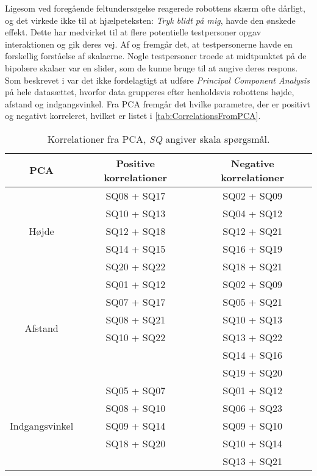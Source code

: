 Ligesom ved foregående feltundersøgelse reagerede robottens skærm ofte dårligt, og det virkede ikke til at hjælpeteksten: \textit{Tryk blidt på mig}, havde den ønskede effekt. Dette har medvirket til at flere potentielle testpersoner opgav interaktionen og gik deres vej.\blankline
%
Af  og  fremgår det, at testpersonerne havde en forskellig forståelse af skalaerne. Nogle testpersoner troede at midtpunktet på de bipolære skalaer var en slider, som de kunne bruge til at angive deres respons. \blankline 
%
Som beskrevet i  var det ikke fordelagtigt at udføre \textit{Principal Component Analysis} på hele datasættet, hvorfor data grupperes efter henholdsvis robottens højde, afstand og indgangsvinkel. Fra PCA fremgår det hvilke parametre, der er positivt og negativt korreleret, hvilket er listet i \autoref{tab:CorrelationsFromPCA}. 
%
\begin{table}[H]
	\centering
	\begin{tabular}{ c|c|c }
		\centering
		PCA & Positive korrelationer & Negative korrelationer \\ \hline
		\multirow{5}{*}{Højde} & SQ08  + SQ17 & SQ02  + SQ09 \\
		& SQ10 + SQ13 & SQ04 + SQ12 \\
		& SQ12 + SQ18 & SQ12 + SQ21 \\
		& SQ14 + SQ15 & SQ16 + SQ19 \\
		& SQ20 + SQ22 & SQ18 + SQ21\\ \hline
		\multirow{6}{*}{Afstand} & SQ01 + SQ12 & SQ02 + SQ09 \\
		& SQ07 + SQ17 & SQ05 + SQ21 \\
		& SQ08 + SQ21 & SQ10 + SQ13 \\
		& SQ10 + SQ22 & SQ13 + SQ22 \\
		&  & SQ14 + SQ16 \\	
		&  & SQ19 + SQ20 \\ \hline	
		\multirow{5}{*}{Indgangsvinkel} 
		& SQ05 + SQ07 & SQ01 + SQ12 \\
		& SQ08 + SQ10 & SQ06 + SQ23 \\
		& SQ09 + SQ14 & SQ09 + SQ10 \\
		& SQ18 + SQ20 & SQ10 + SQ14 \\
		&  & SQ13 + SQ21
	\end{tabular}        
\caption{Korrelationer fra PCA, \textit{SQ} angiver skala spørgsmål.}
\label{tab:CorrelationsFromPCA}
\end{table}
\noindent
